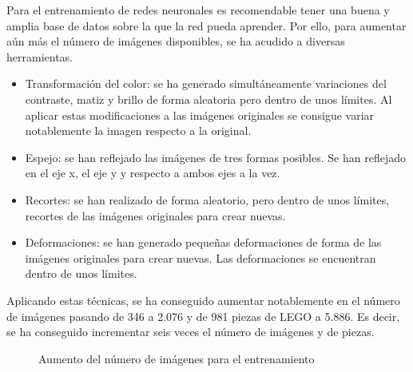 Para el entrenamiento de redes neuronales es recomendable tener una buena y amplia base de datos sobre la que la red pueda aprender. Por ello, para aumentar aún más el número de imágenes disponibles, se ha acudido a diversas herramientas.

\begin{itemize}
\item Transformación del color: se ha generado simultáneamente variaciones del contraste, matiz y brillo de forma aleatoria pero dentro de unos límites. Al aplicar estas modificaciones a las imágenes originales se consigue variar notablemente la imagen respecto a la original.
\item Espejo: se han reflejado las imágenes de tres formas posibles. Se han reflejado en el eje x, el eje y y respecto a ambos ejes a la vez.
\item Recortes: se han realizado de forma aleatorio, pero dentro de unos límites, recortes de las imágenes originales para crear nuevas.
\item Deformaciones: se han generado pequeñas deformaciones de forma de las imágenes originales para crear nuevas. Las deformaciones se encuentran dentro de unos límites.
\end{itemize}

Aplicando estas técnicas, se ha conseguido aumentar notablemente en el número de imágenes pasando de 346 a 2.076 y de 981 piezas de LEGO a 5.886. Es decir, se ha conseguido incrementar seis veces el número de imágenes y de piezas.

\begin{figure}[ht]  %
  \hfill	
  \hfill	
\caption{Aumento del número de imágenes para el entrenamiento}
\label{fig:RCNN augmentation}
\vspace{-5pt}
\end{figure}

